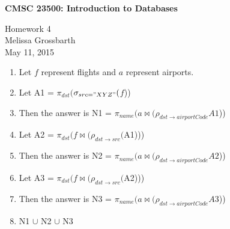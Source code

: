 \documentclass{article}[12pt]
\newcommand{\assignment}{Homework 4}
\newcommand{\whoami}{Melissa Grossbarth}
\newcommand{\assignmentdate}{May 11, 2015}
\newcommand{\rel}[1]{\ensuremath{#1}}
\newcommand{\nj}[2]{\ensuremath{#1 \bowtie #2}}
\newcommand{\sel}[2]{\ensuremath{\sigma_{#1} #2}}
\newcommand{\proj}[2]{\ensuremath{\pi_{#1} #2}}
\newcommand{\ren}[2]{\ensuremath{\rho_{#1} #2}}
\begin{document}
{\large \bf CMSC 23500: Introduction to Databases}

\assignment \\
\whoami \\
\assignmentdate

\hrulefill


\begin{enumerate}

\item[]Let \rel{f} represent flights and \rel{a} represent airports.

\item Let A1 = \proj{dst}({\sel{src="XYZ"}(\rel{f})})

\item[] Then the answer is N1 = \proj{name}(\nj{\rel{a}}({\ren{dst \rightarrow airportCode}{A1}}))

\item Let A2 = \proj{dst}(\nj{\rel{f}}({\ren{dst \rightarrow src} (A1)}))

\item[] Then the answer is N2 = \proj{name}(\nj{\rel{a}}({\ren{dst \rightarrow airportCode}{A2}}))

\item Let A3 = \proj{dst}(\nj{\rel{f}}({\ren{dst \rightarrow src} (A2)}))

\item[] Then the answer is N3 = \proj{name}(\nj{\rel{a}}({\ren{dst \rightarrow airportCode}{A3}}))

\item N1 $\cup$ N2 $\cup$ N3

\end{enumerate}
\end{document}
